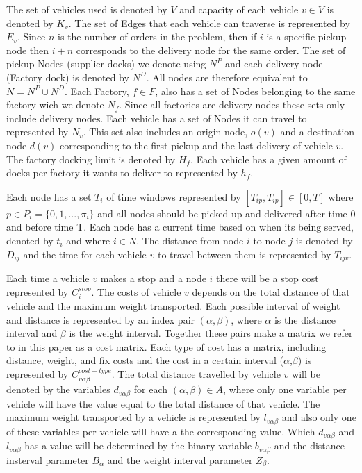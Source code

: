 \documentclass[a4paper,10pt]{article}
\begin{document}
\linebreak
\linebreak
\par
The set of vehicles used is denoted by $V$ and capacity of each vehicle $v \in V$ is denoted by $K_v$.
The set of Edges that each vehicle can traverse is represented by $E_v$. 
Since $n$ is the number of orders in the problem, then if $i$ is a specific pickup-node then $i+n$ corresponds to the delivery node for the same order.
The set of pickup Nodes (supplier docks) we denote using $N^P$ and each delivery node (Factory dock) is denoted by $N^D$. 
All nodes are therefore equivalent to $N = N^P \cup N^D$. 
Each Factory, $f \in F$, also has a set of Nodes belonging to the same factory wich we denote $N_f$. Since all factories are delivery nodes these sets only include delivery nodes.
Each vehicle has a set of Nodes it can travel to represented by $N_v$.
This set also includes an origin node, $o(v)$ and a destination node $d(v)$ corresponding to the first pickup and the last delivery of vehicle $v$. 
The factory docking limit is denoted by $H_f$. 
Each vehicle has a given amount of docks per factory it wants to deliver to represented by $h_{f}$. \par 
Each node has a set $T_{i}$ of time windows represented by $[ \underline{T_{ip}},  \overline{T_{ip}} ] \in [0,T]$ where $p \in P_i=\{0,1,...,\pi_i\}$ and all nodes should be picked up and delivered after time 0 and before time T.
Each node has a current time based on when its being served, denoted by $t_{i}$ and where $i \in N$. 
The distance from node $i$ to node $j$ is denoted by $D_{ij}$ and the time for each vehicle $v$ to travel between them is represented by $T_{ijv}$. \par 
Each time a vehicle $v$ makes a stop and a node $i$ there will be a stop cost represented by $C_i^{stop}$. 
The costs of vehicle $v$ depends on the total distance of that vehicle and the maximum weight transported. 
Each possible interval of weight and distance is represented by an index pair $(\alpha,\beta)$, where $\alpha$ is the distance interval and $\beta$ is the weight interval. 
Together these pairs make a matrix we refer to in this paper as a cost matrix. 
Each type of cost has a matrix, including distance, weight, and fix costs and the cost in a certain interval ($\alpha$,$\beta$) is represented by $C_{v\alpha\beta}^{cost-type}$. 
The total distance travelled by vehicle $v$ will be denoted by the variables $d_{v\alpha\beta}$ for each $(\alpha,\beta)\in A$, where only one variable per vehicle will have the value equal to the total distance of that vehicle. 
The maximum weight transported by a vehicle is represented by $l_{v\alpha\beta}$ and also only one of these variables per vehicle will have a the corresponding value.
Which $d_{v\alpha\beta}$ and $l_{v\alpha\beta}$ has a value will be determined by the binary variable $b_{v\alpha\beta}$ and the distance insterval parameter $B_\alpha$ and the weight interval parameter $Z_\beta$.  
\linebreak
\end{document}
